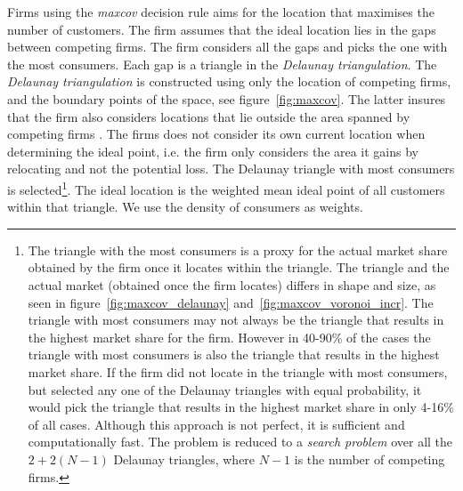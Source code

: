 \documentclass[preprint, 12pt]{elsarticle}
\begin{document}
Firms using the \emph{maxcov} decision rule aims for the location that maximises the number of customers. The firm assumes that the ideal location lies in the gaps between competing firms. The firm considers all the gaps and picks the one with the most consumers. Each gap is a triangle in the \emph{Delaunay triangulation}. The \emph{Delaunay triangulation} is constructed using only the location of competing firms, and the boundary points of the space, see figure~\ref{fig:maxcov}. The latter insures that the firm also considers locations that lie outside the area spanned by competing firms \citep[p.~556]{Cheong_Efrat_Har-Peled_2007}. The firms does not consider its own current location when determining the ideal point, i.e. the firm only considers the area it gains by relocating and not the potential loss. The Delaunay triangle with most consumers is selected\footnote{The triangle with the most consumers is a proxy for the actual market share obtained by the firm once it locates within the triangle. The triangle and the actual market (obtained once the firm locates) differs in shape and size, as seen in figure~\ref{fig:maxcov_delaunay} and~\ref{fig:maxcov_voronoi_incr}. The triangle with most consumers may not always be the triangle that results in the highest market share for the firm. However in 40-90\% of the cases the triangle with most consumers is also the triangle that results in the highest market share. If the firm did not locate in the triangle with most consumers, but selected any one of the Delaunay triangles with equal probability, it would pick the triangle that results in the highest market share in only 4-16\% of all cases. Although this approach is not perfect, it is sufficient and computationally fast. The problem is reduced to a \emph{search problem} over all the $2+2(N-1)$ Delaunay triangles, where $N-1$ is the number of competing firms.}. The ideal location is the weighted mean ideal point of all customers within that triangle. We use the density of consumers as weights.
\end{document}
